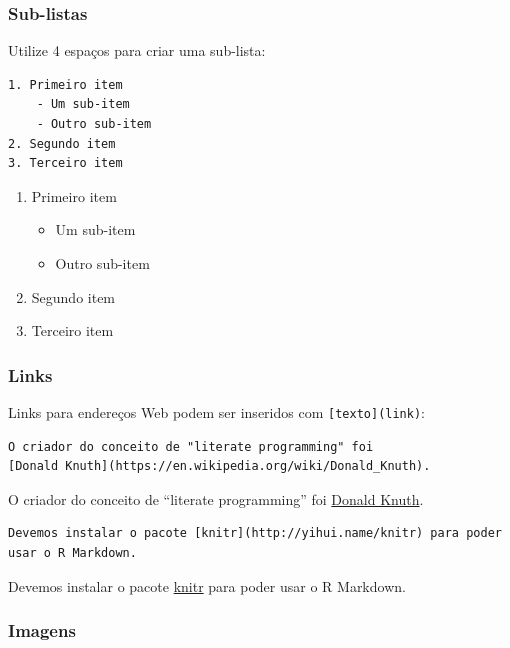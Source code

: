 \documentclass[10pt,a4paper]{book}
\providecommand{\tightlist}{%
  \setlength{\itemsep}{0pt}\setlength{\parskip}{0pt}}
\begin{document}
\subsubsection*{Sub-listas}\label{sub-listas}


Utilize 4 espaços para criar uma sub-lista:

\begin{verbatim}
1. Primeiro item
    - Um sub-item
    - Outro sub-item
2. Segundo item
3. Terceiro item
\end{verbatim}

\begin{enumerate}
\def\labelenumi{\arabic{enumi}.}
\tightlist
\item
  Primeiro item

  \begin{itemize}
  \tightlist
  \item
    Um sub-item
  \item
    Outro sub-item
  \end{itemize}
\item
  Segundo item
\item
  Terceiro item
\end{enumerate}

\subsubsection*{Links}\label{links}


Links para endereços Web podem ser inseridos com
\texttt{{[}texto{]}(link)}:

\begin{verbatim}
O criador do conceito de "literate programming" foi
[Donald Knuth](https://en.wikipedia.org/wiki/Donald_Knuth).
\end{verbatim}

O criador do conceito de ``literate programming'' foi
\href{https://en.wikipedia.org/wiki/Donald_Knuth}{Donald Knuth}.

\begin{verbatim}
Devemos instalar o pacote [knitr](http://yihui.name/knitr) para poder
usar o R Markdown.
\end{verbatim}

Devemos instalar o pacote \href{http://yihui.name/knitr}{knitr} para
poder usar o R Markdown.

\subsubsection*{Imagens}\label{imagens}
\end{document}
